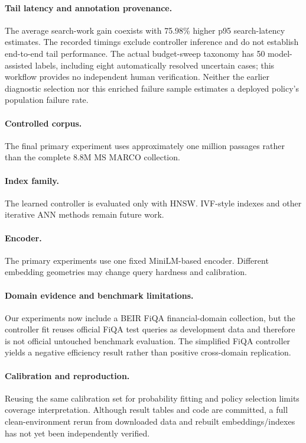 \documentclass[10pt,twocolumn]{article}
\begin{document}
\paragraph{Tail latency and annotation provenance.}
The average search-work gain coexists with 75.98\% higher p95 search-latency estimates. The recorded timings exclude controller inference and do not establish end-to-end tail performance. The actual budget-sweep taxonomy has 50 model-assisted labels, including eight automatically resolved uncertain cases; this workflow provides no independent human verification. Neither the earlier diagnostic selection nor this enriched failure sample estimates a deployed policy's population failure rate.

\paragraph{Controlled corpus.}
The final primary experiment uses approximately one million passages rather than the complete 8.8M MS MARCO collection.

\paragraph{Index family.}
The learned controller is evaluated only with HNSW. IVF-style indexes and other iterative ANN methods remain future work.

\paragraph{Encoder.}
The primary experiments use one fixed MiniLM-based encoder. Different embedding geometries may change query hardness and calibration.

\paragraph{Domain evidence and benchmark limitations.}
Our experiments now include a BEIR FiQA financial-domain collection, but the controller fit reuses official FiQA test queries as development data and therefore is not official untouched benchmark evaluation. The simplified FiQA controller yields a negative efficiency result rather than positive cross-domain replication.

\paragraph{Calibration and reproduction.}
Reusing the same calibration set for probability fitting and policy selection limits coverage interpretation. Although result tables and code are committed, a full clean-environment rerun from downloaded data and rebuilt embeddings/indexes has not yet been independently verified.
\end{document}
